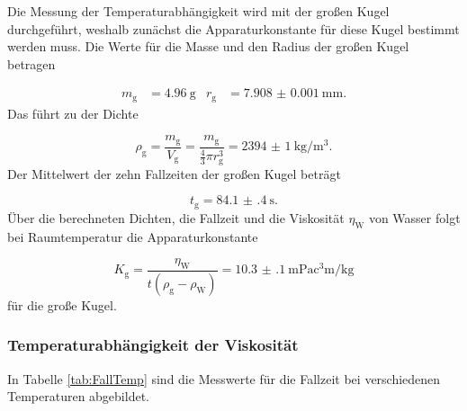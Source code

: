 Die Messung der Temperaturabhängigkeit wird mit der großen Kugel durchgeführt,
weshalb zunächst die Apparaturkonstante für diese Kugel bestimmt werden muss.
Die Werte für die Masse und den Radius der großen Kugel betragen

\begin{align}
  m_\text{g} & = \SI{4.96}{\gram} & r_\text{g} & = \SI{7.908(1)}{\milli\meter}.
\end{align}
Das führt zu der Dichte

\begin{equation}
  \rho_\text{g} = \frac{m_\text{g}}{V_\text{g}} = \frac{m_\text{g}}
  {\frac{4}{3}\pi r_\text{g}^3} = \SI{2394(1)}{\kilo\gram\per\cubic\meter}.
  \label{eqn:rhog}
\end{equation}
Der Mittelwert der zehn Fallzeiten der großen Kugel beträgt

\begin{equation}
  t_\text{g} = \SI{84.1(4)}{\second}.
\end{equation}
Über die berechneten Dichten, die Fallzeit und die Viskosität $\eta_\text{W}$
von Wasser folgt bei Raumtemperatur die Apparaturkonstante

\begin{equation}
  K_\text{g} = \frac{\eta_\text{W}}{t(\rho_\text{g}-\rho_\text{W})}
  = \SI{10.3(1)}{\milli\pascal\cubic\centi\meter\per\kilo\gram}
\end{equation}
für die große Kugel.

\subsubsection{Temperaturabhängigkeit der Viskosität}

In Tabelle \ref{tab:FallTemp} sind die Messwerte für die Fallzeit
bei verschiedenen Temperaturen abgebildet.

